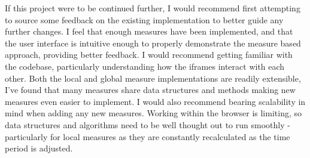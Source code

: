 If this project were to be continued further, I would recommend first attempting to source some feedback on the existing implementation to better guide any further changes. I feel that enough measures have been implemented, and that the user interface is intuitive enough to properly demonstrate the measure based approach, providing better feedback. I would recommend getting familiar with the codebase, particularly understanding how the iframes interact with each other. Both the local and global measure implementations are readily extensible, I've found that many measures share data structures and methods making new measures even easier to implement.
I would also recommend bearing scalability in mind when adding any new measures. Working within the browser is limiting, so data structures and algorithms need to be well thought out to run smoothly - particularly for local measures as they are constantly recalculated as the time period is adjusted.
